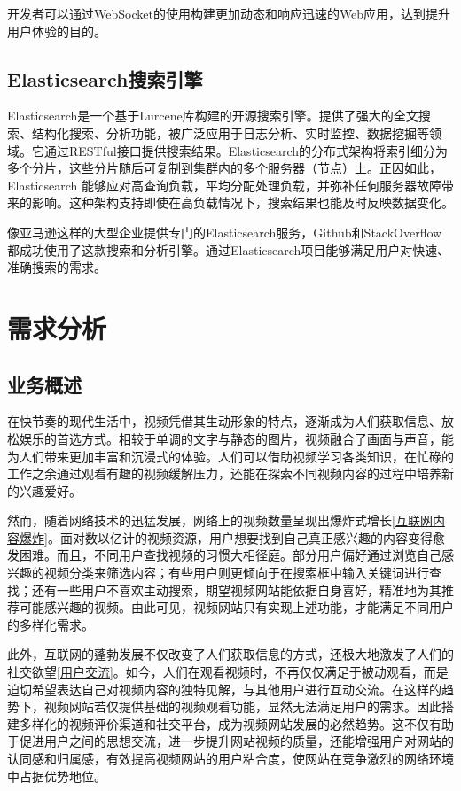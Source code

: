 开发者可以通过WebSocket的使用构建更加动态和响应迅速的Web应用，达到提升用户体验的目的。

\subsection{Elasticsearch搜索引擎}

Elasticsearch是一个基于Lurcene库构建的开源搜索引擎。提供了强大的全文搜索、结构化搜索、分析功能，被广泛应用于日志分析、实时监控、数据挖掘等领域。它通过RESTful接口提供搜索结果。Elasticsearch的分布式架构将索引细分为多个分片，这些分片随后可复制到集群内的多个服务器（节点）上。正因如此，Elasticsearch 能够应对高查询负载，平均分配处理负载，并弥补任何服务器故障带来的影响。这种架构支持即使在高负载情况下，搜索结果也能及时反映数据变化\cite{EN02}。

像亚马逊这样的大型企业提供专门的Elasticsearch服务，Github和StackOverflow都成功使用了这款搜索和分析引擎。通过Elasticsearch项目能够满足用户对快速、准确搜索的需求。
\newpage

\section{需求分析}

\subsection{业务概述}

在快节奏的现代生活中，视频凭借其生动形象的特点，逐渐成为人们获取信息、放松娱乐的首选方式。相较于单调的文字与静态的图片，视频融合了画面与声音，能为人们带来更加丰富和沉浸式的体验。人们可以借助视频学习各类知识，在忙碌的工作之余通过观看有趣的视频缓解压力，还能在探索不同视频内容的过程中培养新的兴趣爱好。

然而，随着网络技术的迅猛发展，网络上的视频数量呈现出爆炸式增长\ref{互联网内容爆炸}。面对数以亿计的视频资源，用户想要找到自己真正感兴趣的内容变得愈发困难。而且，不同用户查找视频的习惯大相径庭。部分用户偏好通过浏览自己感兴趣的视频分类来筛选内容；有些用户则更倾向于在搜索框中输入关键词进行查找；还有一些用户不喜欢主动搜索，期望视频网站能依据自身喜好，精准地为其推荐可能感兴趣的视频。由此可见，视频网站只有实现上述功能，才能满足不同用户的多样化需求。

此外，互联网的蓬勃发展不仅改变了人们获取信息的方式，还极大地激发了人们的社交欲望\ref{用户交流}。如今，人们在观看视频时，不再仅仅满足于被动观看，而是迫切希望表达自己对视频内容的独特见解，与其他用户进行互动交流。在这样的趋势下，视频网站若仅提供基础的视频观看功能，显然无法满足用户的需求。因此搭建多样化的视频评价渠道和社交平台，成为视频网站发展的必然趋势。这不仅有助于促进用户之间的思想交流，进一步提升网站视频的质量，还能增强用户对网站的认同感和归属感，有效提高视频网站的用户粘合度，使网站在竞争激烈的网络环境中占据优势地位。 

